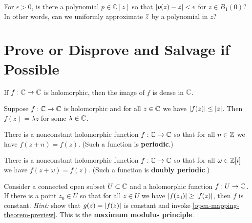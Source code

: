 \documentclass{homework}
\begin{document}
\begin{problem}\label{uniformly-approximate-conj}For $\epsilon > 0$, is there a polynomial $p \in \mathbb{C}[z]$ so
  that $\left|p(z) - \bar{z}\right| < \epsilon$ for $z \in B_1(0)$?  In
  other words, can we uniformly approximate $\bar{z}$ by a polynomial
  in $z$?
\end{problem}

\section{Prove or Disprove and Salvage if Possible}

\begin{problem}\label{entire-is-dense}If $f : \mathbb{C} \to \mathbb{C}$ is
  holomorphic, then the image of $f$ is dense in $\mathbb{C}$.
\end{problem}

\begin{problem}\label{identity-dominate-entire}Suppose $f : \mathbb{C} \to \mathbb{C}$
  is holomorphic and for all $z \in \mathbb{C}$ we have
  $\left|f(z)\right| \leq \left|z\right|$.  Then $f(z) = \lambda z$ for some
  $\lambda \in \mathbb{C}$.
\end{problem}

\begin{problem}
  There is a nonconstant holomorphic function $f : \mathbb{C} \to \mathbb{C}$ so that
  for all $n \in \mathbb{Z}$ we have $f(z + n) = f(z)$.  (Such a function is
  \textbf{periodic}.)
\end{problem}

\begin{problem}\label{doubly-periodic}There is a nonconstant holomorphic function $f : \mathbb{C} \to \mathbb{C}$ so that
  for all $\omega \in \mathbb{Z}[i]$ we have $f(z + \omega) = f(z)$.  (Such a
  function is \textbf{doubly periodic}.)
\end{problem}

\begin{problem}\label{maximum-modulus-principle}Consider a connected open subset $U \subset \mathbb{C}$ and a holomorphic
  function $f : U \to \mathbb{C}$.  If there is a point $z_0 \in U$ so that
  for all $z \in U$ we have $\left|f(z_0)\right| \geq \left|f(z)\right|$, then $f$
  is constant.  \textit{Hint:} show that $g(z) = \left|f(z)\right|$ is
  constant and invoke \ref{open-mapping-theorem-preview}.  This is the
  \textbf{maximum modulus principle}.
\end{problem}
\end{document}
